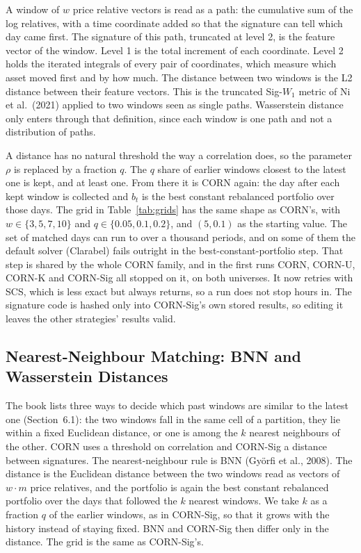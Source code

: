 \documentclass[11pt]{article}
\begin{document}
A window of $w$ price relative vectors is read as a path: the cumulative
sum of the log relatives, with a time coordinate added so that the
signature can tell which day came first. The signature of this path,
truncated at level 2, is the feature vector of the window. Level 1 is the
total increment of each coordinate. Level 2 holds the iterated integrals
of every pair of coordinates, which measure which asset moved first and by
how much. The distance between two windows is the L2 distance between
their feature vectors. This is the truncated Sig-$W_1$ metric of Ni et
al.\ (2021) applied to two windows seen as single paths. Wasserstein
distance only enters through that definition, since each window is one
path and not a distribution of paths.

A distance has no natural threshold the way a correlation does, so the
parameter $\rho$ is replaced by a fraction $q$. The $q$ share of earlier
windows closest to the latest one is kept, and at least one. From there it
is CORN again: the day after each kept window is collected and $b_t$ is
the best constant rebalanced portfolio over those days. The grid in
Table~\ref{tab:grids} has the same shape as CORN's, with
$w \in \{3,5,7,10\}$ and $q \in \{0.05, 0.1, 0.2\}$, and $(5, 0.1)$ as the
starting value. The set of matched days can run to over a thousand
periods, and on some of them the default solver (Clarabel) fails outright
in the best-constant-portfolio step. That step is shared by the whole CORN
family, and in the first runs CORN, CORN-U, CORN-K and CORN-Sig all stopped
on it, on both universes. It now retries with SCS, which is less exact but
always returns, so a run does not stop hours in. The signature code is
hashed only into CORN-Sig's own stored results, so editing it leaves the
other strategies' results valid.

\subsection{Nearest-Neighbour Matching: BNN and Wasserstein Distances}
\label{sec:knn}

The book lists three ways to decide which past windows are similar to the
latest one (Section~6.1): the two windows fall in the same cell of a
partition, they lie within a fixed Euclidean distance, or one is among the
$k$ nearest neighbours of the other. CORN uses a threshold on correlation
and CORN-Sig a distance between signatures. The nearest-neighbour rule is
BNN (Gy\"orfi et al., 2008). The distance is the Euclidean distance between
the two windows read as vectors of $w \cdot m$ price relatives, and the
portfolio is again the best constant rebalanced portfolio over the days
that followed the $k$ nearest windows. We take $k$ as a fraction $q$ of the
earlier windows, as in CORN-Sig, so that it grows with the history instead
of staying fixed. BNN and CORN-Sig then differ only in the distance. The grid is the same as CORN-Sig's.
\end{document}
